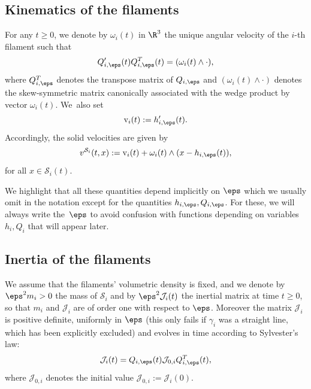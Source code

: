 \subsection{Kinematics of the filaments}
For any $t \geq 0$, we denote by $\omega_i(t)$ in $\R^3$ the unique angular velocity
of the $i$-th filament such that
\begin{equation}
\label{satane}
Q_{i,\eps}' (t) Q_{i,\eps}^{T} (t) = (\omega_i(t) \wedge \cdot),
\end{equation}
where $Q_{i,\eps}^{T}$ denotes the transpose matrix of $Q_{i,\eps}$ and $ (\omega_i(t) \wedge \cdot)$ denotes the skew-symmetric matrix canonically associated with the wedge product by vector $\omega_i(t)$.
We~also set\vspace*{-3pt}
\begin{equation}
\label{det-v-rm}
\textrm{v}_i(t) := h_{i,\eps}'(t).
\end{equation}
Accordingly, the solid velocities are given by
\begin{equation}
\label{vit-sol}
v^{{\mathcal S}_i}(t,x) := \textrm{v}_i(t) + \omega_i(t) \wedge (x-h_{i,\eps}(t)),
\end{equation}
for all $x\in\mathcal S_i(t)$.

We highlight that all these quantities depend implicitly on $\eps$ which we usually omit in the notation except for the quantities $h_{i,\eps},Q_{i,\eps}$. For these, we will always write the~$\eps$ to avoid confusion with functions depending on variables $h_i,Q_i$ that will appear later.

\subsection{Inertia of the filaments}
We assume that the filaments' volumetric density is fixed, and we
denote by $\eps^2 m_{i} >0$ the mass of $\mathcal S_i$ and by
$\eps^2 {\mathcal J}_{i} (t)$
the inertial matrix at time $t \geq 0$, so that $m_{i}$ and ${\mathcal J}_{i}$ are of order one with respect to $\eps$.
Moreover the matrix
${\mathcal J}_{i}$ is positive definite, uniformly in $\eps$ (this only fails if $\gamma_i$ was a straight line, which has been explicitly excluded)
and evolves in time
according to Sylvester's law:
\begin{equation} \label{eq:Sylvester}
{\mathcal J}_{i} (t) = Q_{i,\eps}(t) \mathcal{J}_{0,i} Q_{i,\eps}^{T} (t),
\end{equation}
where $ \mathcal{J}_{0,i} $ denotes the initial value $\mathcal{J}_{0,i} := {\mathcal J}_{i} (0)$.

